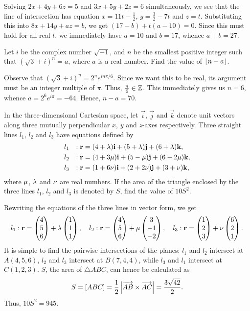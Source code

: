 Solving $2x + 4y + 6z = 5$ and $3x + 5y + 2z = 6$ simultaneously, we see that the line of intersection has equation $x = 11t - \frac12$, $y = \frac32 - 7t$ and $z = t$. Substituting this into $8x + 14y + az = b$, we get $(17-b) + t(a-10) = 0$. Since this must hold for all real $t$, we immediately have $a = 10$ and $b = 17$, whence $a + b = 27$.

\begin{question}[70]\label{A::2020-O-1-5}
    Let $i$ be the complex number $\sqrt{-1}$, and $n$ be the smallest positive integer such that $(\sqrt3 + i)^n = a$, where $a$ is a real number. Find the value of $\left\lfloor n-a \right\rfloor$.
\end{question}

Observe that $(\sqrt3 + i)^n = 2^n e^{in\pi/6}$. Since we want this to be real, its argument must be an integer multiple of $\pi$. Thus, $\frac{n}{6} \in \mathbb{Z}$. This immediately gives us $n = 6$, whence $a = 2^6 e^{i\pi} = -64$. Hence, $n - a = 70$.

\begin{question}[945]\label{A::2020-O-1-6}
    In the three-dimensional Cartesian space, let $\vec i$, $\vec j$ and $\vec k$ denote unit vectors along three mutually perpendicular $x$, $y$ and $z$-axes respectively. Three straight lines $l_1$, $l_2$ and $l_3$ have equations defined by
    \begin{alignat*}{2}
    l_1 && : \mathbf{r} &= (4 + \lambda)\mathbf{i} + (5 + \lambda)\mathbf{j} + (6 + \lambda)\mathbf{k},\\
    l_2 && : \mathbf{r} &= (4 + 3\mu)\mathbf{i} + (5 - \mu)\mathbf{j} + (6 - 2\mu) \mathbf{k},\\
    l_3 && : \mathbf{r} &= (1 + 6\nu)\mathbf{i} + (2 + 2\nu) \mathbf{j} + (3 + \nu) \mathbf{k},
    \end{alignat*}
    where $\mu$, $\lambda$ and $\nu$ are real numbers. If the area of the triangle enclosed by the three lines $l_1$, $l_2$ and $l_3$ is denoted by $S$, find the value of $10S^2$.
\end{question}

Rewriting the equations of the three lines in vector form, we get \[l_1 : \mathbf{r} = \begin{pmatrix} 4 \\ 5 \\ 6 \end{pmatrix} + \lambda \begin{pmatrix} 1 \\ 1 \\ 1 \end{pmatrix}, \quad l_2 : \mathbf{r} = \begin{pmatrix} 4 \\ 5 \\ 6 \end{pmatrix} + \mu \begin{pmatrix} 3 \\ -1 \\ -2 \end{pmatrix}, \quad l_3 : \mathbf{r} = \begin{pmatrix} 1 \\ 2 \\ 3 \end{pmatrix} + \nu \begin{pmatrix} 6 \\ 2 \\ 1 \end{pmatrix}.\] It is simple to find the pairwise intersections of the planes: $l_1$ and $l_2$ intersect at $A(4, 5, 6)$, $l_2$ and $l_3$ intersect at $B(7, 4, 4)$, while $l_3$ and $l_1$ intersect at $C(1, 2, 3)$. $S$, the area of $\triangle ABC$, can hence be calculated as \[S = [ABC] = \frac12 \left\lvert \overrightarrow{AB} \times \overrightarrow{AC} \right\rvert = \frac{3\sqrt{42}}{2}.\] Thus, $10S^2 = 945$.

